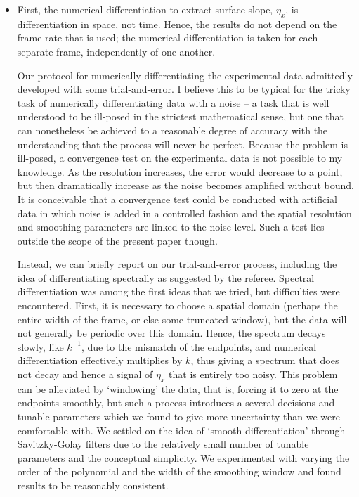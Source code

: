 \documentclass[11pt]{article}
\begin{document}
\begin{itemize}
\item First, the numerical differentiation to extract surface slope, $\eta_x$, is differentiation in space, not time. Hence, the results do not depend on the frame rate that is used; the numerical differentiation is taken for each separate frame, independently of one another. 

Our protocol for numerically differentiating the experimental data admittedly developed with some trial-and-error. I believe this to be typical for the tricky task of numerically differentiating data with a noise -- a task that is well understood to be ill-posed in the strictest mathematical sense, but one that can nonetheless be achieved to a reasonable degree of accuracy with the understanding that the process will never be perfect. Because the problem is ill-posed, a convergence test on the experimental data is not possible to my knowledge. As the resolution increases, the error would decrease to a point, but then dramatically increase as the noise becomes amplified without bound. It is conceivable that a convergence test could be conducted with artificial data in which noise is added in a controlled fashion and the spatial resolution and smoothing parameters are linked to the noise level. Such a test lies outside the scope of the present paper though.

Instead, we can briefly report on our trial-and-error process, including the idea of differentiating spectrally as suggested by the referee. Spectral differentiation was among the first ideas that we tried, but difficulties were encountered. First, it is necessary to choose a spatial domain (perhaps the entire width of the frame, or else some truncated window), but the data will not generally be periodic over this domain. Hence, the spectrum decays slowly, like $k^{-1}$, due to the mismatch of the endpoints, and numerical differentiation effectively multiplies by $k$, thus giving a spectrum that does not decay and hence a signal of $\eta_x$ that is entirely too noisy. This problem can be alleviated by `windowing' the data, that is, forcing it to zero at the endpoints smoothly, but such a process introduces a several decisions and tunable parameters which we found to give more uncertainty than we were comfortable with. We settled on the idea of `smooth differentiation' through Savitzky-Golay filters due to the relatively small number of tunable parameters and the conceptual simplicity. We experimented with varying the order of the polynomial and the width of the smoothing window and found results to be reasonably consistent.
\end{itemize}
\end{document}

